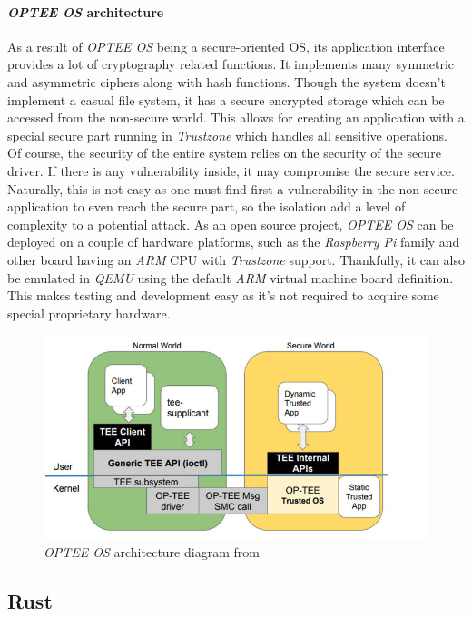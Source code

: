 \paragraph{\textit{OPTEE OS} architecture}
As a result of \textit{OPTEE OS} being a secure-oriented OS, its application interface provides a lot of cryptography related functions. It implements many symmetric and asymmetric ciphers along with hash functions. Though the system doesn't implement a casual file system, it has a secure encrypted storage which can be accessed from the non-secure world. This allows for creating an application with a special secure part running in \textit{Trustzone} which handles all sensitive operations. Of course, the security of the entire system relies on the security of the secure driver. If there is any vulnerability inside, it may compromise the secure service. Naturally, this is not easy as one must find first a vulnerability in the non-secure application to even reach the secure part, so the isolation add a level of complexity to a potential attack. As an open source project, \textit{OPTEE OS} can be deployed on a couple of hardware platforms, such as the \textit{Raspberry Pi} family and other board having an \textit{ARM} CPU with \textit{Trustzone} support. Thankfully, it can also be emulated in \textit{QEMU} using the default \textit{ARM} virtual machine board definition. This makes testing and development easy as it's not required to acquire some special proprietary hardware.

\begin{figure}[h!]
    \centering
    \includegraphics[width=.8\linewidth]{tex/img/op-tee-software-architecture.jpg}
    \caption{\textit{OPTEE OS} architecture diagram from \cite{opteeblog}}
    \label{fig:optee}
\end{figure}


\subsection{Rust}

